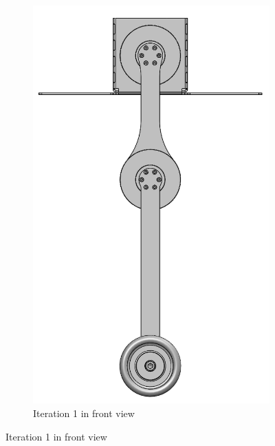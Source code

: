\begin{figure}[H]
\begin{subfigure}[b]{0.3\textwidth}
        \includegraphics[width=\textwidth]{figures/hardware_setup/double_pendulum_it1_v2.png}
        \caption{Iteration 1 in front view}
        \label{fig:image2}
    \end{subfigure}

    \vspace{1em} %


\end{figure}
